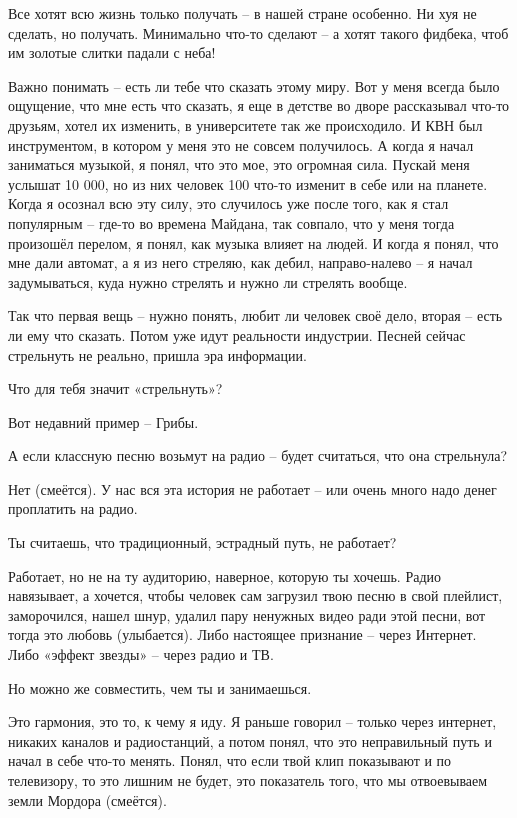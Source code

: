 Все хотят всю жизнь только получать – в нашей стране особенно. Ни хуя не
сделать, но получать. Минимально что-то сделают – а хотят такого фидбека, чтоб
им золотые слитки падали с неба!

Важно понимать – есть ли тебе что сказать этому миру. Вот у меня всегда было
ощущение, что мне есть что сказать, я еще в детстве во дворе рассказывал что-то
друзьям, хотел их изменить, в университете так же происходило. И КВН был
инструментом, в котором у меня это не совсем получилось. А когда я начал
заниматься музыкой, я понял, что это мое, это огромная сила. Пускай меня
услышат 10 000, но из них человек 100 что-то изменит в себе или на планете.
Когда я осознал всю эту силу, это случилось уже после того, как я стал
популярным – где-то во времена Майдана, так совпало, что у меня тогда произошёл
перелом, я понял, как музыка влияет на людей. И когда я понял, что мне дали
автомат, а я из него стреляю, как дебил, направо-налево – я начал задумываться,
куда нужно стрелять и нужно ли стрелять вообще.

Так что первая вещь – нужно понять, любит ли человек своё дело, вторая – есть
ли ему что сказать. Потом уже идут реальности индустрии. Песней сейчас
стрельнуть не реально, пришла эра информации.

Что для тебя значит «стрельнуть»?

Вот недавний пример – Грибы.

А если классную песню возьмут на радио – будет считаться, что она стрельнула?

Нет (смеётся). У нас вся эта история не работает – или очень много надо денег
проплатить на радио.

Ты считаешь, что традиционный, эстрадный путь, не работает?

Работает, но не на ту аудиторию, наверное, которую ты хочешь. Радио навязывает,
а хочется, чтобы человек сам загрузил твою песню в свой плейлист, заморочился,
нашел шнур, удалил пару ненужных видео ради этой песни, вот тогда это любовь
(улыбается). Либо настоящее признание – через Интернет. Либо «эффект звезды» –
через радио и ТВ.

Но можно же совместить, чем ты и занимаешься.

Это гармония, это то, к чему я иду. Я раньше говорил – только через интернет,
никаких каналов и радиостанций, а потом понял, что это неправильный путь и
начал в себе что-то менять. Понял, что если твой клип показывают и по
телевизору, то это лишним не будет, это показатель того, что мы отвоевываем
земли Мордора (смеётся).

